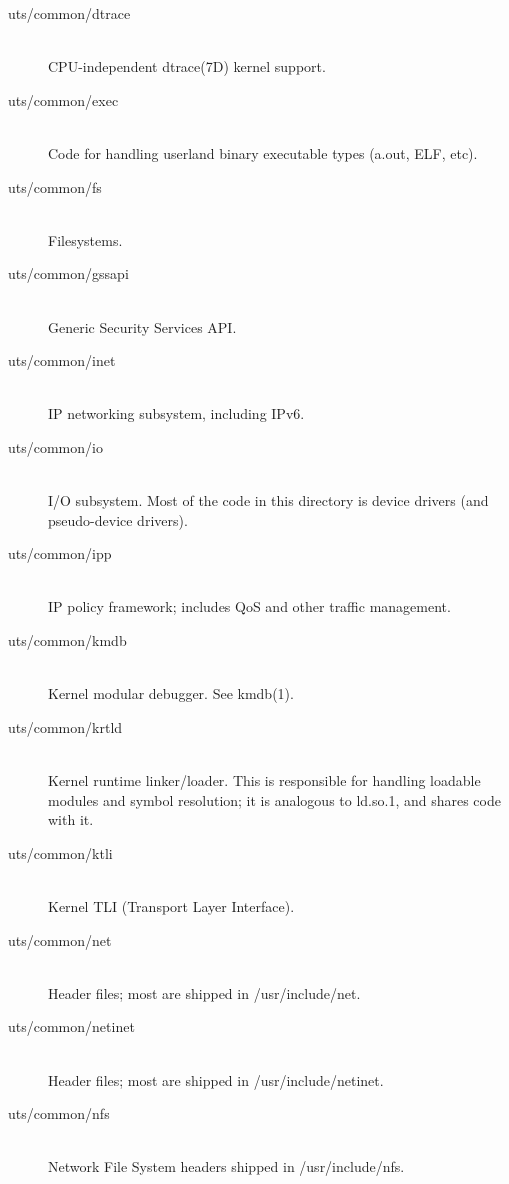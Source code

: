 \documentclass{article}
\begin{document}
\begin{description}
\item[uts/common/dtrace] \hfill \\
  CPU-independent dtrace(7D) kernel support.

\item[uts/common/exec] \hfill \\
  Code for handling userland binary executable types (a.out, ELF, etc).

\item[uts/common/fs] \hfill \\
  Filesystems.

\item[uts/common/gssapi] \hfill \\
  Generic Security Services API.

\item[uts/common/inet] \hfill \\
  IP networking subsystem, including IPv6.

\item[uts/common/io] \hfill \\
  I/O subsystem. Most of the code in this directory is device drivers (and
  pseudo-device drivers).

\item[uts/common/ipp] \hfill \\
  IP policy framework; includes QoS and other traffic management.

\item[uts/common/kmdb] \hfill \\
  Kernel modular debugger. See kmdb(1).

\item[uts/common/krtld] \hfill \\
  Kernel runtime linker/loader. This is responsible for handling loadable
  modules and symbol resolution; it is analogous to ld.so.1, and shares code
  with it.

\item[uts/common/ktli] \hfill \\
  Kernel TLI (Transport Layer Interface).

\item[uts/common/net] \hfill \\
  Header files; most are shipped in /usr/include/net.

\item[uts/common/netinet] \hfill \\
  Header files; most are shipped in /usr/include/netinet.

\item[uts/common/nfs] \hfill \\
  Network File System headers shipped in /usr/include/nfs.


\end{description}
\end{document}
